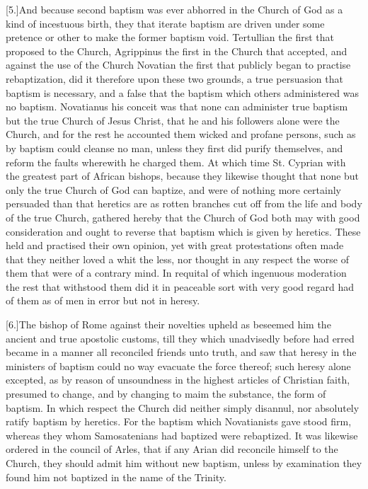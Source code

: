 [5.]And because second baptism was ever abhorred in the Church of God as a kind of incestuous birth, they that iterate baptism are driven under some pretence or other to make the former baptism void. Tertullian the first that proposed to the Church, Agrippinus the first in the Church  that accepted,
 and against the use of the Church Novatian the first that publicly began to practise rebaptization, did it therefore upon these two grounds, a true persuasion that baptism is necessary, and a false that the baptism which others administered was no baptism. Novatianus his conceit was that none can administer true baptism but the true Church of Jesus Christ, that he and his followers alone were the Church, and for the rest he accounted them wicked and profane persons, such as by baptism could cleanse no man, unless they first did purify themselves, and reform the faults wherewith he charged them. At which time St. Cyprian with the greatest part of African bishops, because they likewise thought that none but only the true Church of God can baptize, and were of nothing more certainly persuaded than that heretics are as rotten branches cut off from the life and body of the true Church, gathered hereby that the Church of God both may with good consideration and ought to reverse that baptism which is given by heretics. These held and practised their own opinion, yet with great protestations often made that they neither loved a whit the less, nor thought in any respect the worse of them that were of a contrary mind. In requital of which ingenuous moderation the rest that withstood them did it in peaceable sort with very good regard had of them as of men in error but not in heresy.

[6.]The bishop of Rome against their novelties upheld as beseemed him the ancient and true apostolic customs, till they which unadvisedly before had erred became in a manner all reconciled friends unto truth, and saw that heresy in the ministers of baptism could no way evacuate the force thereof; such heresy alone excepted, as by reason of  unsoundness in the highest articles of Christian faith, presumed to change, and by changing to maim the substance, the form of baptism. In which respect the Church did neither simply disannul, nor absolutely ratify baptism by heretics. For the baptism which Novatianists gave stood firm, whereas they whom Samosatenians had baptized were rebaptized. It was likewise ordered in the council of Arles, that if any Arian did reconcile himself to the Church, they should admit him without new baptism, unless by examination they found him not baptized in the name of the Trinity.

